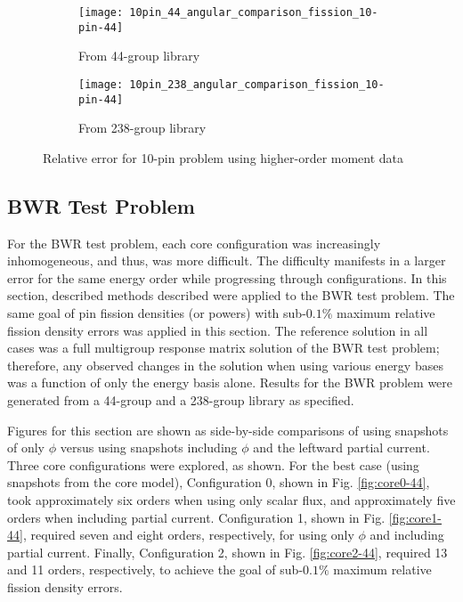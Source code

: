 \documentclass[5p,times,twocolumn,10pt]{elsarticle}
\begin{document}
  \begin{figure*}[!ht]
    \centering
    \begin{subfigure}{0.5\textwidth}
      \centering
      \texttt{[image: 10pin\_44\_angular\_comparison\_fission\_10-pin-44]}
      \caption{From 44-group library}
      \label{fig:10-pin_angularA}
    \end{subfigure}%
    \begin{subfigure}{0.5\textwidth}
      \centering
      \texttt{[image: 10pin\_238\_angular\_comparison\_fission\_10-pin-44]}
      \caption{From 238-group library}
      \label{fig:10-pin_angularB}
    \end{subfigure}
    \caption{Relative error for 10-pin problem using higher-order moment data}
    \label{fig:10-pin_angular}
  \end{figure*}
  
  \subsection{BWR Test Problem}
  
  For the BWR test problem, each core configuration was increasingly inhomogeneous, and thus, was more difficult.  The difficulty 
  manifests in a larger error for the same energy order while progressing through configurations.  In this section, described methods
  described were applied to the BWR test problem. The same goal of pin fission densities (or powers) with
  sub-$0.1\%$ maximum relative fission density errors was applied in this section.  The reference solution in all cases was a full multigroup response matrix
  solution of the BWR test problem; therefore, any observed changes in the solution when using various energy bases was a function of only the
  energy basis alone.  Results for the BWR problem were generated from a 44-group and a 238-group library as specified.
  
  Figures for this section are shown as side-by-side comparisons of using snapshots of only $\phi$ versus using snapshots
  including $\phi$ and the leftward partial current.  Three core configurations were explored, as shown.
  For the best case (using snapshots from the core model), Configuration 0, shown in 
  Fig. \ref{fig:core0-44}, took approximately six orders when
  using only scalar flux, and approximately five orders when including partial current.  Configuration 1, shown in Fig. \ref{fig:core1-44},
  required seven and eight orders, respectively, for using only $\phi$ and including partial current.  Finally, Configuration 2, shown in Fig. \ref{fig:core2-44},
  required 13 and 11 orders, respectively, to achieve the goal of sub-$0.1\%$ maximum relative fission density errors.  
  
\end{document}
